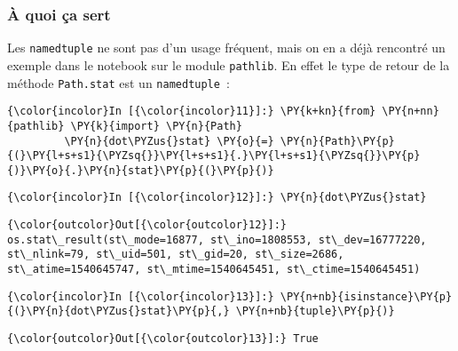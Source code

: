     \hypertarget{uxe0-quoi-uxe7a-sert}{%
\subsubsection{À quoi ça sert}\label{uxe0-quoi-uxe7a-sert}}

    Les \texttt{namedtuple} ne sont pas d'un usage fréquent, mais on en a
déjà rencontré un exemple dans le notebook sur le module
\texttt{pathlib}. En effet le type de retour de la méthode
\texttt{Path.stat} est un \texttt{namedtuple}~:

    \begin{Verbatim}[commandchars=\\\{\},frame=single,framerule=0.3mm,rulecolor=\color{cellframecolor}]
{\color{incolor}In [{\color{incolor}11}]:} \PY{k+kn}{from} \PY{n+nn}{pathlib} \PY{k}{import} \PY{n}{Path}
         \PY{n}{dot\PYZus{}stat} \PY{o}{=} \PY{n}{Path}\PY{p}{(}\PY{l+s+s1}{\PYZsq{}}\PY{l+s+s1}{.}\PY{l+s+s1}{\PYZsq{}}\PY{p}{)}\PY{o}{.}\PY{n}{stat}\PY{p}{(}\PY{p}{)}
\end{Verbatim}


    \begin{Verbatim}[commandchars=\\\{\},frame=single,framerule=0.3mm,rulecolor=\color{cellframecolor}]
{\color{incolor}In [{\color{incolor}12}]:} \PY{n}{dot\PYZus{}stat}
\end{Verbatim}


\begin{Verbatim}[commandchars=\\\{\},frame=single,framerule=0.3mm,rulecolor=\color{cellframecolor}]
{\color{outcolor}Out[{\color{outcolor}12}]:} os.stat\_result(st\_mode=16877, st\_ino=1808553, st\_dev=16777220, st\_nlink=79, st\_uid=501, st\_gid=20, st\_size=2686, st\_atime=1540645747, st\_mtime=1540645451, st\_ctime=1540645451)
\end{Verbatim}
            
    \begin{Verbatim}[commandchars=\\\{\},frame=single,framerule=0.3mm,rulecolor=\color{cellframecolor}]
{\color{incolor}In [{\color{incolor}13}]:} \PY{n+nb}{isinstance}\PY{p}{(}\PY{n}{dot\PYZus{}stat}\PY{p}{,} \PY{n+nb}{tuple}\PY{p}{)}
\end{Verbatim}


\begin{Verbatim}[commandchars=\\\{\},frame=single,framerule=0.3mm,rulecolor=\color{cellframecolor}]
{\color{outcolor}Out[{\color{outcolor}13}]:} True
\end{Verbatim}
            

